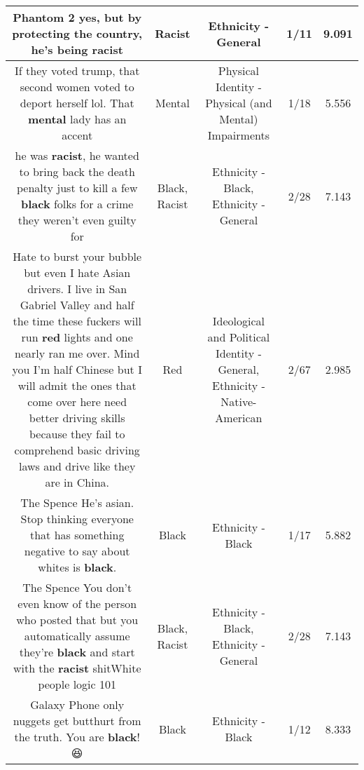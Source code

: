 \documentclass[11pt]{article}
\newlength\mylength
\begin{document}
\begin{center}
\begin{longtable}{|C{.65\mylength}|C{.30\mylength}|C{.12\mylength}|C{.12\mylength}|C{.12\mylength}|}
  \small Phantom 2 yes, but by protecting the country, he's being racist\normalsize   & Racist & Ethnicity - General & 1/11 & 9.091 \\  \hline
  \small If they voted trump, that second women voted to deport herself lol. That \textbf{mental} lady has an accent\normalsize   & Mental & Physical Identity - Physical (and Mental) Impairments & 1/18 & 5.556 \\  \hline
  \small {} he was \textbf{racist}, he wanted to bring back the death penalty just to kill a few \textbf{black} folks for a crime they weren't even guilty for\normalsize   & Black, Racist & Ethnicity - Black, Ethnicity - General & 2/28 & 7.143 \\  \hline
  \small Hate to burst your bubble but even I hate Asian drivers. I live in San Gabriel Valley and half the time these fuckers will run \textbf{r\textbf{ed}} lights and one nearly ran me over. Mind you I'm half Chinese but I will admit the ones that come over here need better driving skills because they fail to comprehend basic driving laws and drive like they are in China.\normalsize   & Red &  Ideological and Political Identity - General, Ethnicity - Native-American & 2/67 & 2.985 \\  \hline
  \small The Spence He's asian. Stop thinking everyone that has something negative to say about whites is \textbf{black}.\normalsize   & Black & Ethnicity - Black & 1/17 & 5.882 \\  \hline
  \small The Spence You don't even know of the person who posted that but you automatically assume they're \textbf{black} and start with the \textbf{racist} shitWhite people logic 101\normalsize   & Black, Racist & Ethnicity - Black, Ethnicity - General & 2/28 & 7.143 \\  \hline
  \small Galaxy Phone only nuggets get butthurt from the truth. You are \textbf{black}!😆\normalsize   & Black & Ethnicity - Black & 1/12 & 8.333 \\  \hline

\end{longtable}
\end{center}
\end{document}
